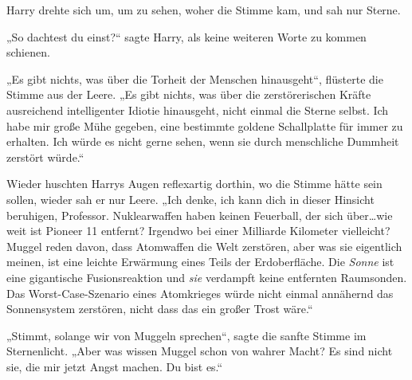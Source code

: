 Harry drehte sich um, um zu sehen, woher die Stimme kam, und sah nur Sterne.

„So dachtest du einst?“ sagte Harry, als keine weiteren Worte zu kommen schienen.

„Es gibt nichts, was über die Torheit der Menschen hinausgeht“, flüsterte die Stimme aus der Leere. „Es gibt nichts, was über die zerstörerischen Kräfte ausreichend intelligenter Idiotie hinausgeht, nicht einmal die Sterne selbst. Ich habe mir große Mühe gegeben, eine bestimmte goldene Schallplatte für immer zu erhalten. Ich würde es nicht gerne sehen, wenn sie durch menschliche Dummheit zerstört würde.“

Wieder huschten Harrys Augen reflexartig dorthin, wo die Stimme hätte sein sollen, wieder sah er nur Leere.
„Ich denke, ich kann dich in dieser Hinsicht beruhigen, Professor. Nuklearwaffen haben keinen Feuerball, der sich über…wie weit ist Pioneer 11 entfernt? Irgendwo bei einer Milliarde Kilometer vielleicht? Muggel reden davon, dass Atomwaffen die Welt zerstören, aber was sie eigentlich meinen, ist eine leichte Erwärmung eines Teils der Erdoberfläche. Die \emph{Sonne} ist eine gigantische Fusionsreaktion und \emph{sie} verdampft keine entfernten Raumsonden. Das Worst-Case-Szenario eines Atomkrieges würde nicht einmal annähernd das Sonnensystem zerstören, nicht dass das ein großer Trost wäre.“

„Stimmt, solange wir von Muggeln sprechen“, sagte die sanfte Stimme im Sternenlicht. „Aber was wissen Muggel schon von wahrer Macht? Es sind nicht sie, die mir jetzt Angst machen. Du bist es.“

